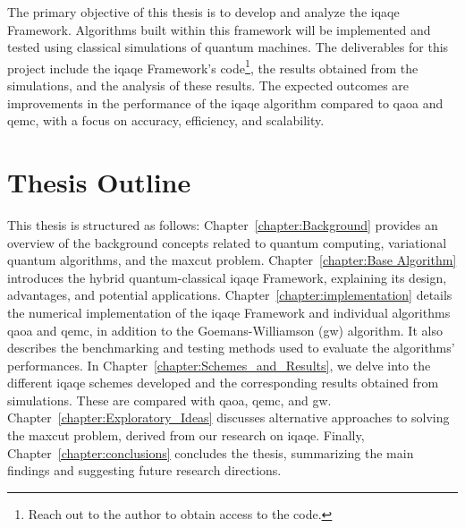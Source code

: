 
The primary objective of this thesis is to develop and analyze the \acrshort{iqaqe} Framework. Algorithms built within this framework will be implemented and tested using classical simulations of quantum machines. The deliverables for this project include the \acrshort{iqaqe} Framework's code\footnote{Reach out to the author to obtain access to the code.}, the results obtained from the simulations, and the analysis of these results. The expected outcomes are improvements in the performance of the \acrshort{iqaqe} algorithm compared to \acrshort{qaoa} and \acrshort{qemc}, with a focus on accuracy, efficiency, and scalability.

\section{Thesis Outline}
\label{section:outline}




This thesis is structured as follows: Chapter~\ref{chapter:Background} provides an overview of the background concepts related to quantum computing, variational quantum algorithms, and the \acrshort{maxcut} problem. Chapter~\ref{chapter:Base Algorithm} introduces the hybrid quantum-classical \acrshort{iqaqe} Framework, explaining its design, advantages, and potential applications. Chapter~\ref{chapter:implementation} details the numerical implementation of the \acrshort{iqaqe} Framework and individual algorithms \acrshort{qaoa} and \acrshort{qemc}, in addition to the Goemans-Williamson (\acrshort{gw}) algorithm. It also describes the benchmarking and testing methods used to evaluate the algorithms' performances. In Chapter~\ref{chapter:Schemes_and_Results}, we delve into the different \acrshort{iqaqe} schemes developed and the corresponding results obtained from simulations. These are compared with \acrshort{qaoa}, \acrshort{qemc}, and \acrshort{gw}. Chapter~\ref{chapter:Exploratory_Ideas} discusses alternative approaches to solving the \acrshort{maxcut} problem, derived from our research on \acrshort{iqaqe}. Finally, Chapter~\ref{chapter:conclusions} concludes the thesis, summarizing the main findings and suggesting future research directions.

